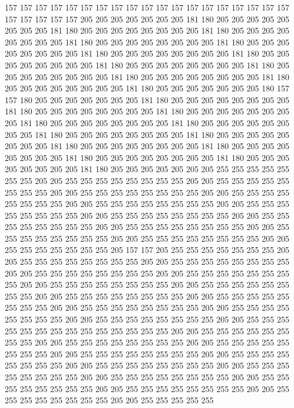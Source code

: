 157 157 157 157 157 157 157 157 157 157 157 157 157 157 157 157 157 157 157 157
157 157 157 157 205 205 205 205 205 205 205 181 180 205 205 205 205 205 205 205
205 181 180 205 205 205 205 205 205 205 205 181 180 205 205 205 205 205 205 205
205 181 180 205 205 205 205 205 205 205 205 181 180 205 205 205 205 205 205 205
205 181 180 205 205 205 205 205 205 205 205 181 180 205 205 205 205 205 205 205
205 181 180 205 205 205 205 205 205 205 205 181 180 205 205 205 205 205 205 205
205 181 180 205 205 205 205 205 205 205 205 181 180 205 205 205 205 205 205 205
205 181 180 205 205 205 205 205 205 205 180 157 157 180 205 205 205 205 205 205
205 181 180 205 205 205 205 205 205 205 205 181 180 205 205 205 205 205 205 205
205 181 180 205 205 205 205 205 205 205 205 181 180 205 205 205 205 205 205 205
205 181 180 205 205 205 205 205 205 205 205 181 180 205 205 205 205 205 205 205
205 181 180 205 205 205 205 205 205 205 205 181 180 205 205 205 205 205 205 205
205 181 180 205 205 205 205 205 205 205 205 181 180 205 205 205 205 205 205 205
205 181 180 205 205 205 205 205 205 205 205 181 180 205 205 205 205 205 205 205
255 255 255 255 255 255 255 205 205 255 255 255 255 255 255 255 255 205 205 255
255 255 255 255 255 255 255 205 205 255 255 255 255 255 255 255 255 205 205 255
255 255 255 255 255 255 255 205 205 255 255 255 255 255 255 255 255 205 205 255
255 255 255 255 255 255 255 205 205 255 255 255 255 255 255 255 255 205 205 255
255 255 255 255 255 255 255 205 205 255 255 255 255 255 255 255 255 205 205 255
255 255 255 255 255 255 255 205 205 255 255 255 255 255 255 255 255 205 205 255
255 255 255 255 255 255 205 157 157 205 255 255 255 255 255 255 255 205 205 255
255 255 255 255 255 255 255 205 205 255 255 255 255 255 255 255 255 205 205 255
255 255 255 255 255 255 255 205 205 255 255 255 255 255 255 255 255 205 205 255
255 255 255 255 255 255 255 205 205 255 255 255 255 255 255 255 255 205 205 255
255 255 255 255 255 255 255 205 205 255 255 255 255 255 255 255 255 205 205 255
255 255 255 255 255 255 255 205 205 255 255 255 255 255 255 255 255 205 205 255
255 255 255 255 255 255 255 205 205 255 255 255 255 255 255 255 255 255 255 255
255 255 255 205 205 255 255 255 255 255 255 255 255 205 205 255 255 255 255 255
255 255 255 205 205 255 255 255 255 255 255 255 255 205 205 255 255 255 255 255
255 255 255 205 205 255 255 255 255 255 255 255 255 205 205 255 255 255 255 255
255 255 255 205 205 255 255 255 255 255 255 255 255 205 205 255 255 255 255 255
255 255 255 205 205 255 255 255 255 255 255 255 255 205 205 255 255 255 255 255
255 255 255 205 205 255 255 255 255 255 255 255 255 205 205 255 255 255 255 255
